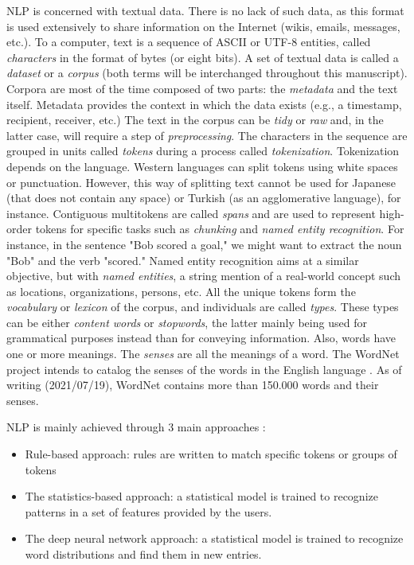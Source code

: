 NLP is concerned with textual data.
There is no lack of such data, as this format is used extensively to share information on the Internet (wikis, emails, messages, etc.).
To a computer, text is a sequence of ASCII or UTF-8 entities, called \emph{characters} in the format of bytes (or eight bits).
A set of textual data is called a \emph{dataset} or a \emph{corpus} (both terms will be interchanged throughout this manuscript).
Corpora are most of the time composed of two parts: the \emph{metadata} and the text itself.
Metadata provides the context in which the data exists (e.g., a timestamp, recipient, receiver, etc.)
The text in the corpus can be \emph{tidy} or \emph{raw} and, in the latter case, will require a step of \emph{preprocessing}.
The characters in the sequence are grouped in units called \emph{tokens} during a process called \emph{tokenization}.
Tokenization depends on the language.
Western languages can split tokens using white spaces or punctuation.
However, this way of splitting text cannot be used for Japanese (that does not contain any space) or Turkish (as an agglomerative language), for instance.
Contiguous multitokens are called \emph{spans} and are used to represent high-order tokens for specific tasks such as \emph{chunking} and \emph{named entity recognition}.
For instance, in the sentence "Bob scored a goal," we might want to extract the noun "Bob" and the verb "scored."
Named entity recognition aims at a similar objective, but with \emph{named entities}, a string mention of a real-world concept such as locations, organizations, persons, etc.
All the unique tokens form the \emph{vocabulary} or \emph{lexicon} of the corpus, and individuals are called \emph{types}.
These types can be either \emph{content words} or \emph{stopwords}, the latter mainly being used for grammatical purposes instead than for conveying information.
Also, words have one or more meanings.
The \emph{senses} are all the meanings of a word.
The WordNet project intends to catalog the senses of the words in the English language \parencite{millerWordNetLexicalDatabase1995}.
As of writing (2021/07/19), WordNet contains more than 150.000 words and their senses.

NLP is mainly achieved through 3 main approaches \parencite{hirschbergAdvancesNaturalLanguage2015}:

\begin{itemize}
    \item Rule-based approach: rules are written to match specific tokens or groups of tokens
    \item The statistics-based approach: a statistical model is trained to recognize patterns in a set of features provided by the users.
    \item The deep neural network approach: a statistical model is trained to recognize word distributions and find them in new entries.
\end{itemize}


